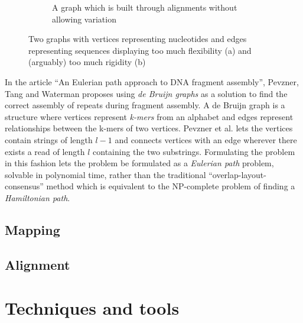 \documentclass[thesis.tex]{subfiles}
\begin{document}
\begin{wrapfigure}{L}{0.65\textwidth}
\begin{mdframed}
\begin{subfigure}[t]{\textwidth}
\begin{mdframed}
\begin{center}
        \end{center}
      \end{mdframed}
      \caption{A graph which is built through alignments without allowing variation}
    \end{subfigure}
  \end{mdframed}
  \caption{Two graphs with vertices representing nucleotides and edges representing sequences displaying too much flexibility (a) and (arguably) too much rigidity (b)}
  \label{fig:flexibility_rigidness_tradeoff}
\end{wrapfigure}
In the article ``An Eulerian path approach to DNA fragment assembly''\cite{an_eulerian_path_approach_to_dna_fragment_assembly}, Pevzner, Tang and Waterman proposes using \textit{de Bruijn graphs} as a solution to find the correct assembly of repeats during fragment assembly. A de Bruijn graph is a structure where vertices represent \textit{k-mers} from an alphabet and edges represent relationships between the k-mers of two vertices. Pevzner et al. lets the vertices contain strings of length $l-1$ and connects vertices with an edge wherever there exists a read of length $l$ containing the two substrings. Formulating the problem in this fashion lets the problem be formulated as a \textit{Eulerian path} problem, solvable in polynomial time, rather than the traditional ``overlap-layout-consensus'' method which is equivalent to the NP-complete problem of finding a \textit{Hamiltonian path}.
\subsection{Mapping}
\subsection{Alignment}
\section{Techniques and tools}
\end{document}
